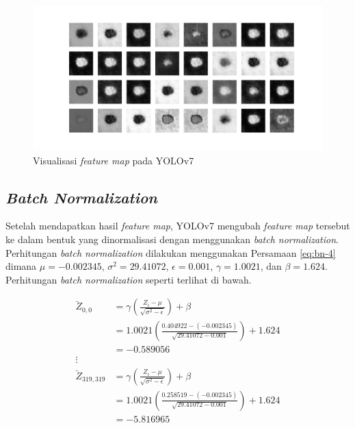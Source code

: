     \begin{figure}[H]
        \begin{center}
            \includegraphics[width=12cm]{img/bab4/conv-layer.png}
            \caption{Visualisasi \textit{feature map} pada YOLOv7}
            \label{fig:d-feamap}
        \end{center}
    \end{figure}
    
    \subsection{\textit{Batch Normalization}}

    Setelah mendapatkan hasil \textit{feature map}, YOLOv7 mengubah \textit{feature map} tersebut ke dalam bentuk yang dinormalisasi dengan menggunakan \textit{batch normalization}. Perhitungan \textit{batch normalization} dilakukan menggunakan Persamaan \ref{eq:bn-4} dimana $\mu = -0.002345$, $\sigma^2 = 29.41072$, $\epsilon = 0.001$, $\gamma = 1.0021$, dan $\beta = 1.624$. Perhitungan \textit{batch normalization} seperti terlihat di bawah.

    \begin{align*}
        \breve{Z}_{0, 0}     &= \gamma \left( \frac{Z_{i} - \mu}{\sqrt{\sigma^2 - \epsilon}} \right) + \beta \\
                             &= 1.0021 \left( \frac{0.404922 - (-0.002345)}{\sqrt{29.41072 - 0.001}} \right) + 1.624\\
                             &= -0.589056\\
        \vdots\\
        \breve{Z}_{319, 319} &= \gamma \left( \frac{Z_{i} - \mu}{\sqrt{\sigma^2 - \epsilon}} \right) + \beta \\
                             &= 1.0021 \left( \frac{0.258519 - (-0.002345)}{\sqrt{29.41072 - 0.001}} \right) + 1.624\\
                             &= -5.816965\\
    \end{align*}

